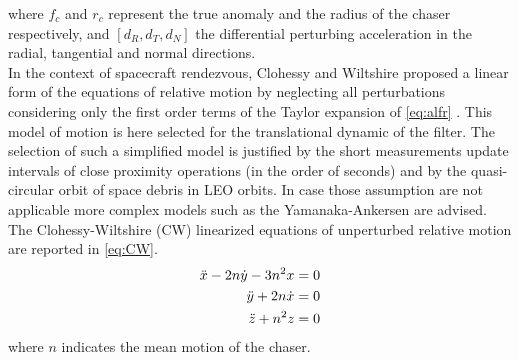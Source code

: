 where $f_c$ and $r_c$ represent the true anomaly and the radius of the chaser respectively, and $[d_R,d_T,d_N]$ the differential perturbing acceleration in the radial, tangential and normal directions. \\
In the context of spacecraft rendezvous, Clohessy and Wiltshire \cite{clohessy1960terminal} proposed a linear form of the equations of relative motion by neglecting all perturbations considering only the first order terms of the Taylor expansion of \cref{eq:alfr} \cite{sullivan2017comprehensive}. This model of motion is here selected for the translational dynamic of the filter. The selection of such a simplified model is justified by the short measurements update intervals  of close proximity operations (in the order of seconds) and by the quasi-circular orbit of space debris in LEO orbits. In case those assumption are not applicable more complex models such as the Yamanaka-Ankersen \cite{yamanaka2002new} are advised. 
The Clohessy-Wiltshire (CW) linearized equations of unperturbed relative motion are reported in \cref{eq:CW}.
\begin{equation}
    \label{eq:CW}
    \begin{split}
        \Ddot{x}-2n\dot{y}-3n^2x & = 0\\
        \Ddot{y}+2n\dot{x} & = 0\\
        \Ddot{z}+n^2z& = 0
    \end{split}
\end{equation}
where $n$ indicates the mean motion of the chaser. 

